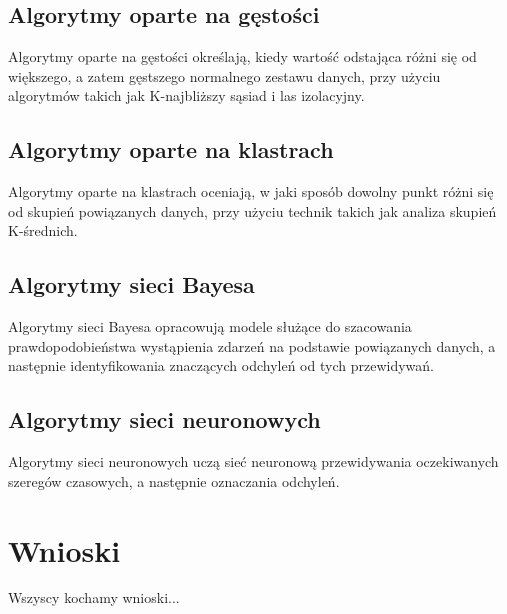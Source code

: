\documentclass[12pt,a4paper]{article}
\begin{document}
\subsection{Algorytmy oparte na gęstości}
Algorytmy oparte na gęstości określają, kiedy wartość odstająca różni się od większego, a zatem gęstszego normalnego zestawu danych, przy użyciu algorytmów takich jak K-najbliższy sąsiad i las izolacyjny.

\subsection{Algorytmy oparte na klastrach}
Algorytmy oparte na klastrach oceniają, w jaki sposób dowolny punkt różni się od skupień powiązanych danych, przy użyciu technik takich jak analiza skupień K-średnich.

\subsection{Algorytmy sieci Bayesa}
Algorytmy sieci Bayesa opracowują modele służące do szacowania prawdopodobieństwa wystąpienia zdarzeń na podstawie powiązanych danych, a następnie identyfikowania znaczących odchyleń od tych przewidywań.

\subsection{Algorytmy sieci neuronowych}
Algorytmy sieci neuronowych uczą sieć neuronową przewidywania oczekiwanych szeregów czasowych, a następnie oznaczania odchyleń.

\section{Wnioski}
Wszyscy kochamy wnioski...

\newpage


\end{document}
